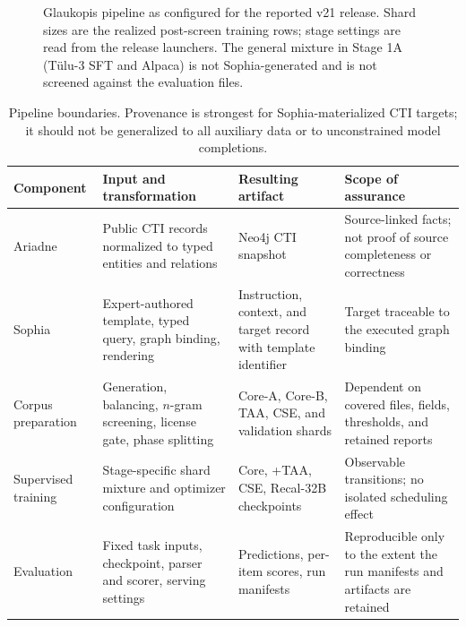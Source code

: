\documentclass[twocolumn]{svjour3}
\begin{document}
\begin{figure}
{}
\caption{Glaukopis pipeline as configured for the reported v21 release. Shard sizes are the realized post-screen training rows; stage settings are read from the release launchers. The general mixture in Stage 1A (T\"ulu-3 SFT and Alpaca) is not Sophia-generated and is not screened against the evaluation files.}\label{fig:pipeline}
\end{figure}

\begin{table}
\centering\footnotesize
\caption{Pipeline boundaries. Provenance is strongest for Sophia-materialized CTI targets; it should not be generalized to all auxiliary data or to unconstrained model completions.}\label{tab:boundaries}
\begin{tabularx}{\textwidth}{@{}P{2.4cm}XXX@{}}
\toprule Component & Input and transformation & Resulting artifact & Scope of assurance \\\midrule
Ariadne & Public CTI records normalized to typed entities and relations & Neo4j CTI snapshot & Source-linked facts; not proof of source completeness or correctness \\
Sophia & Expert-authored template, typed query, graph binding, rendering & Instruction, context, and target record with template identifier & Target traceable to the executed graph binding \\
Corpus preparation & Generation, balancing, $n$-gram screening, license gate, phase splitting & Core-A, Core-B, TAA, CSE, and validation shards & Dependent on covered files, fields, thresholds, and retained reports \\
Supervised training & Stage-specific shard mixture and optimizer configuration & Core, +TAA, CSE, Recal-32B checkpoints & Observable transitions; no isolated scheduling effect \\
Evaluation & Fixed task inputs, checkpoint, parser and scorer, serving settings & Predictions, per-item scores, run manifests & Reproducible only to the extent the run manifests and artifacts are retained \\\bottomrule
\end{tabularx}
\end{table}
\end{document}
